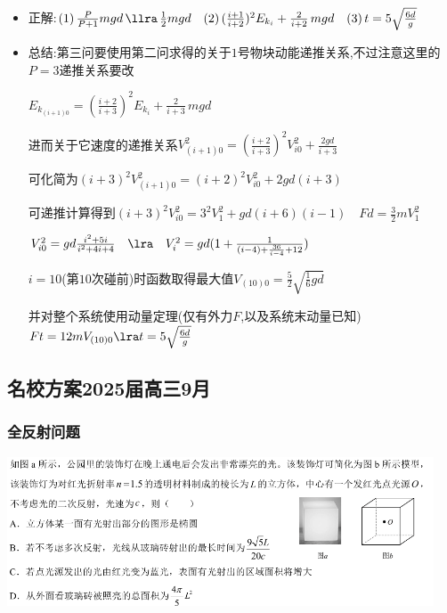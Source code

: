 \documentclass{article}
\begin{document}
\begin{itemize}
    \item 正解:\quad $(1) \, \frac{P}{P+1}mgd \, \llra \, \frac{1}{2}mgd \quad (2) \,
    (\frac{i+1}{i+2})^{2} E_{k_{i}} + \frac{2}{i+2} \, mgd \quad (3) \, t = 5 \sqrt{\frac{6d}{g}} $
    \item 总结:第三问要使用第二问求得的关于$1$号物块动能递推关系,不过注意这里的$P=3$递推关系要改
    
    \hspace{3.2em}$E_{k_{(i+1)0}} = (\frac{i+2}{i+3})^{2} E_{k_{i}} + \frac{2}{i+3} \, mgd$

    \hspace{3.2em}进而关于它速度的递推关系$V_{(i+1)0}^{2} = (\frac{i+2}{i+3})^{2} V_{i0}^{2} + \frac{2gd}{i+3}$

    \hspace{3.2em}可化简为$(i+3)^{2} V_{(i+1)0}^{2} = (i+2)^{2} V_{i0}^{2} + 2gd(i+3)$

    \hspace{3.2em}可递推计算得到$(i+3)^{2}V_{i0}^{2} = 3^{2} V_{1}^{2} + gd(i+6)(i-1) \quad Fd = \frac{3}{2} mV_{1}^{2}$

    \hspace{3.2em}$V_{i0}^{2} = gd \frac{i^{2} + 5i}{i^{2} + 4i + 4} \quad \lra \quad V_{i}^{2} = gd(1 + \frac{1}{(i-4)+\frac{36}{i-4} + 12})$

    \hspace{3.2em}$i = 10$(第$10$次碰前)时函数取得最大值$V_{(10)0} = \frac{5}{2}\sqrt{\frac{1}{6}gd}$
    
    \hspace{3.2em}并对整个系统使用动量定理(仅有外力$F$,以及系统末动量已知)$Ft = 12mV_{(10)0} \lra t= 5\sqrt{\frac{6d}{g}}$
\end{itemize}

\vspace{2em}

\subsection{名校方案2025届高三9月}
\subsubsection{全反射问题}
\includegraphics[width=0.95\textwidth,keepaspectratio]{./pictures/3.14-1.png}
\end{document}
